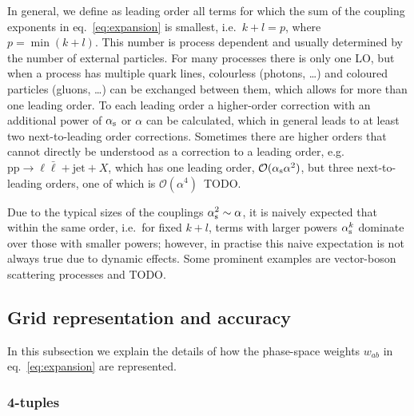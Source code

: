 In general, we define as leading order all terms for which the sum of the coupling exponents in eq.~\eqref{eq:expansion} is smallest, i.e.\ $k + l = p$, where $p = \min (k+l)$.
This number is process dependent and usually determined by the number of external particles.
For many processes there is only one LO, but when a process has multiple quark lines, colourless (photons, \dots) and coloured particles (gluons, \ldots) can be exchanged between them, which allows for more than one leading order.
To each leading order a higher-order correction with an additional power of $\alpha_\mathrm{s}$ or $\alpha$ can be calculated, which in general leads to at least two next-to-leading order corrections.
Sometimes there are higher orders that cannot directly be understood as a correction to a leading order, e.g.\ $\mathrm{p} \mathrm{p} \to \ell \bar{\ell} + \mathrm{jet} + X$, which has one leading order, $\mathcal{O} (\alpha_\mathrm{s} \alpha^2)$, but three next-to-leading orders, one of which is $\mathcal{O} (\alpha^4)$~TODO.

Due to the typical sizes of the couplings $\alpha_\mathrm{s}^2 \sim \alpha$, it is naively expected that within the same order, i.e.\ for fixed $k + l$, terms with larger powers $\alpha_\mathrm{s}^k$ dominate over those with smaller powers; however, in practise this naive expectation is not always true due to dynamic effects.
Some prominent examples are vector-boson scattering processes and TODO.

\subsection{Grid representation and accuracy}
\label{sec:grid-representation}

In this subsection we explain the details of how the phase-space weights $w_{ab}$ in eq.~\ref{eq:expansion} are represented.

\subsubsection{4-tuples}

